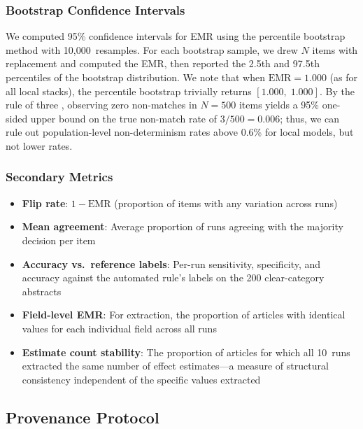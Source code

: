 \documentclass[preprint,review,12pt,authoryear]{elsarticle}
\newcommand{\emr}{\textrm{EMR}}
\newcommand{\ci}[2]{[#1,\;#2]}
\begin{document}
\subsubsection{Bootstrap Confidence Intervals}

We computed 95\% confidence intervals for EMR using the percentile bootstrap method with 10,000~resamples.
For each bootstrap sample, we drew $N$ items with replacement and computed the EMR, then reported the 2.5th and 97.5th percentiles of the bootstrap distribution.
We note that when $\emr{=}1.000$ (as for all local stacks), the percentile bootstrap trivially returns $\ci{1.000}{1.000}$.
By the rule of three \citep{hanley1983ruleofthree}, observing zero non-matches in $N{=}500$ items yields a 95\% one-sided upper bound on the true non-match rate of $3/500{=}0.006$; thus, we can rule out population-level non-determinism rates above 0.6\% for local models, but not lower rates.

\subsubsection{Secondary Metrics}

\begin{itemize}
  \item \textbf{Flip rate}: $1 - \emr$ (proportion of items with any variation across runs)
  \item \textbf{Mean agreement}: Average proportion of runs agreeing with the majority decision per item
  \item \textbf{Accuracy vs.\ reference labels}: Per-run sensitivity, specificity, and accuracy against the automated rule's labels on the 200 clear-category abstracts
  \item \textbf{Field-level EMR}: For extraction, the proportion of articles with identical values for each individual field across all runs
  \item \textbf{Estimate count stability}: The proportion of articles for which all 10~runs extracted the same number of effect estimates---a measure of structural consistency independent of the specific values extracted
\end{itemize}

\subsection{Provenance Protocol}
\label{sec:provenance_protocol}
\end{document}
